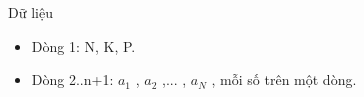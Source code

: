 Dữ liệu
\begin{itemize}
	\item     Dòng 1: N, K, P.   
	\item     Dòng 2..n+1: $a_{1}$    , $a_{2}$    ,... , $a_{N}$    , mỗi số trên một dòng.   
\end{itemize}